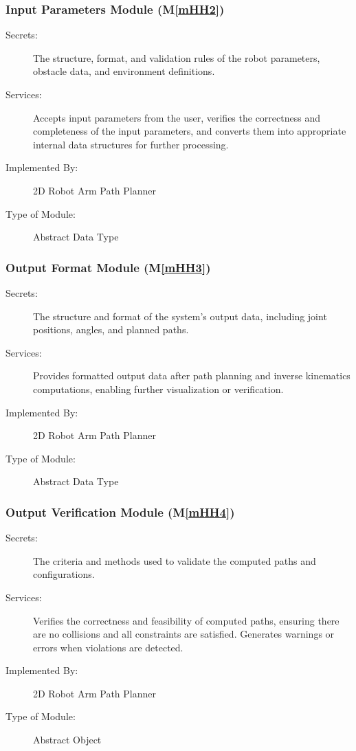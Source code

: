 \documentclass[12pt, titlepage]{article}
\newcommand{\mref}[1]{M\ref{#1}}
\begin{document}
\subsubsection{Input Parameters Module (\mref{mHH2})}

\begin{description}
\item[Secrets:] The structure, format, and validation rules of the robot parameters, obstacle data, and environment definitions.
\item[Services:] Accepts input parameters from the user, verifies the correctness and completeness of the input parameters, and converts them into appropriate internal data structures for further processing.
\item[Implemented By:] 2D Robot Arm Path Planner
\item[Type of Module:] Abstract Data Type
\end{description}

\subsubsection{Output Format Module (\mref{mHH3})}

\begin{description}
\item[Secrets:] The structure and format of the system's output data, including joint positions, angles, and planned paths.
\item[Services:] Provides formatted output data after path planning and inverse kinematics computations, enabling further visualization or verification.
\item[Implemented By:] 2D Robot Arm Path Planner
\item[Type of Module:] Abstract Data Type
\end{description}

\subsubsection{Output Verification Module (\mref{mHH4})}

\begin{description}
\item[Secrets:] The criteria and methods used to validate the computed paths and configurations.
\item[Services:] Verifies the correctness and feasibility of computed paths, ensuring there are no collisions and all constraints are satisfied. Generates warnings or errors when violations are detected.
\item[Implemented By:] 2D Robot Arm Path Planner
\item[Type of Module:] Abstract Object
\end{description}
\end{document}

